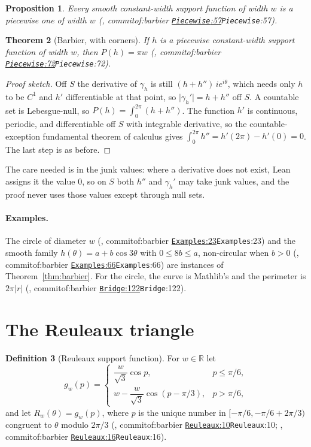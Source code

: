 \documentclass[11pt]{article}
\newtheorem{theorem}{Theorem}
\newtheorem{proposition}[theorem]{Proposition}
\theoremstyle{definition}
\newtheorem{definition}[theorem]{Definition}
\theoremstyle{remark}
\newcommand{\RR}{\mathbb{R}}
\newcommand{\commitof}[1]{\csname commitof:#1\endcsname}
\newcommand{\repo}[1]{https://github.com/jpbald93/#1}
\newcommand{\src}[4]{\ifcsname commitof:#1\endcsname
  \href{\repo{#1}/blob/\commitof{#1}/#2/#3.lean\#L#4}{\texttt{#3}:#4}\else\texttt{#3}:#4\fi}
\begin{document}
\begin{proposition}\label{prop:topw}
Every smooth constant-width support function of width $w$ is a piecewise one of width $w$
(, \src{barbier}{Barbier}{Piecewise}{57}).
\end{proposition}

\begin{theorem}[Barbier, with corners]\label{thm:barbierpw}
If $h$ is a piecewise constant-width support function of width $w$, then $P(h) = \pi w$
(, \src{barbier}{Barbier}{Piecewise}{72}).
\end{theorem}

\begin{proof}[Proof sketch]
Off $S$ the derivative of $\gamma_h$ is still $(h+h'')\,i e^{i\theta}$, which needs only $h$ to be
$C^1$ and $h'$ differentiable at that point, so $\lvert\gamma_h'\rvert = h+h''$ off $S$. A countable
set is Lebesgue-null, so $P(h) = \int_0^{2\pi}(h+h'')$. The function $h'$ is continuous, periodic,
and differentiable off $S$ with integrable derivative, so the countable-exception fundamental theorem
of calculus gives $\int_0^{2\pi}h'' = h'(2\pi)-h'(0) = 0$. The last step is as before.
\end{proof}

The care needed is in the junk values: where a derivative does not exist, Lean assigns it the value
$0$, so on $S$ both $h''$ and $\gamma_h'$ may take junk values, and the proof never uses those values
except through null sets.

\paragraph{Examples.} The circle of diameter $w$ (, \src{barbier}{Barbier}{Examples}{23}) and the smooth family
$h(\theta) = a + b\cos 3\theta$ with $0\le 8b\le a$, non-circular when $b>0$ (, \src{barbier}{Barbier}{Examples}{66}) are instances of Theorem~\ref{thm:barbier}. For the circle, the
curve is Mathlib's  and the perimeter is $2\pi\lvert r\rvert$
(, \src{barbier}{Barbier}{Bridge}{122}).

\section{The Reuleaux triangle}\label{sec:reuleaux}

\begin{definition}[Reuleaux support function]\label{def:reuleaux}
For $w\in\RR$ let
\[
  g_w(p) = \begin{cases} \dfrac{w}{\sqrt3}\cos p, & p\le \pi/6,\\[1ex]
  w - \dfrac{w}{\sqrt3}\cos(p-\pi/3), & p > \pi/6,\end{cases}
\]
and let $R_w(\theta) = g_w(p)$, where $p$ is the unique number in $[-\pi/6, -\pi/6+2\pi/3)$
congruent to $\theta$ modulo $2\pi/3$ (, \src{barbier}{Barbier}{Reuleaux}{10}; , \src{barbier}{Barbier}{Reuleaux}{16}).
\end{definition}
\end{document}
